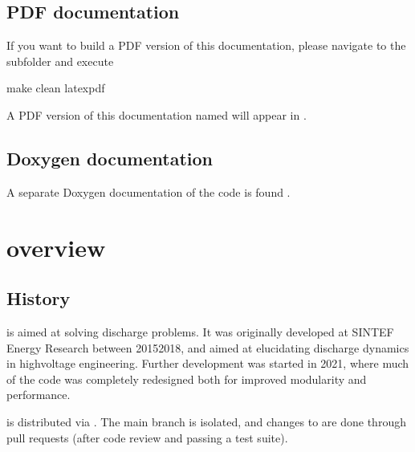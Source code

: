 \documentclass[letterpaper,10pt,english]{sphinxmanual}
\begin{document}
\subsection{PDF documentation}
\label{\detokenize{Base/Documentation:pdf-documentation}}
If you want to build a PDF version of this documentation, please navigate to the  subfolder and execute

\begin{sphinxVerbatim}[commandchars=\\\{\},formatcom=\scriptsize]
make clean latexpdf
\end{sphinxVerbatim}

A PDF version of this documentation named  will appear in .


\subsection{Doxygen documentation}
\label{\detokenize{Base/Documentation:doxygen-documentation}}
A separate Doxygen documentation of the  code is found .


\section{ overview}
\label{\detokenize{Base/Overview:chombo-discharge-overview}}\label{\detokenize{Base/Overview:chap-overview}}\label{\detokenize{Base/Overview::doc}}

\subsection{History}
\label{\detokenize{Base/Overview:history}}
 is aimed at solving discharge problems.
It was originally developed at SINTEF Energy Research between 2015\sphinxhyphen{}2018, and aimed at elucidating discharge dynamics in high\sphinxhyphen{}voltage engineering.
Further development was started in 2021, where much of the code was completely redesigned both for improved modularity and performance.

 is distributed via .
The main branch is isolated, and changes to  are done through pull requests (after code review and passing a test suite).
\end{document}
